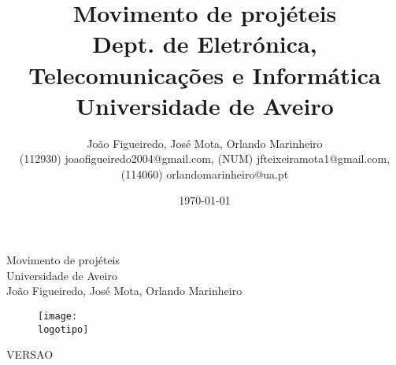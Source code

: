 \documentclass{report}
\begin{document}
%
\def\titulo{Movimento de projéteis}
\def\data{DATA}
\def\autores{João Figueiredo, José Mota, Orlando Marinheiro}
\def\autorescontactos{(112930) joaofigueiredo2004@gmail.com, (NUM) jfteixeiramota1@gmail.com, (114060) orlandomarinheiro@ua.pt}
\def\versao{VERSAO}
\def\departamento{Dept. de Eletrónica, Telecomunicações e Informática}
\def\empresa{Universidade de Aveiro}
\def\logotipo{fotos/ua.pdf}
%
%
\begin{titlepage}

\begin{center}
%
\vspace*{50mm}
%
{\Huge \titulo}\\ 
%
\vspace{10mm}
%
{\Large \empresa}\\
%
\vspace{10mm}
%
{\LARGE \autores}\\ 
%
\vspace{30mm}
%
\begin{figure}[h]
\center
\texttt{[image: \\logotipo]}
\end{figure}
%
\vspace{30mm}
\end{center}
%
\begin{flushright}
\versao
\end{flushright}
\end{titlepage}

\title{%
{\Huge\textbf{\titulo}}\\
{\Large \departamento\\ \empresa}
}
%
\author{%
    \autores \\
    \autorescontactos
}
%
\date{\today}
%
\maketitle

\end{document}
